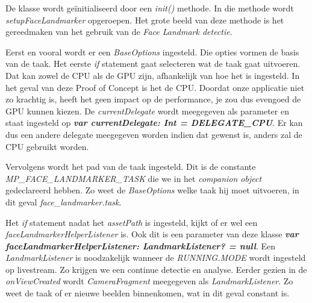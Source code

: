 De klasse wordt geïnitialiseerd door een \emph{init()} methode. In die methode wordt \emph{setupFaceLandmarker} opgeroepen. Het grote beeld van deze methode is het gereedmaken van het gebruik van de \emph{Face Landmark detectie}.

Eerst en vooral wordt er een \emph{BaseOptions} ingesteld. Die opties vormen de basis van de taak. Het eerste \emph{if} statement gaat selecteren wat de taak gaat uitvoeren. Dat kan zowel de CPU als de GPU zijn, afhankelijk van hoe het is ingesteld. In het geval van deze Proof of Concept is het de CPU. Doordat onze applicatie niet zo krachtig is, heeft het geen impact op de performance, je zou dus evengoed de GPU kunnen kiezen. De \emph{currentDelegate} wordt meegegeven als parameter en staat ingesteld op \textbf{\emph{var currentDelegate: Int = DELEGATE\_CPU}}. Er kan dus een andere delegate meegegeven worden indien dat gewenst is, anders zal de CPU gebruikt worden.

Vervolgens wordt het pad van de taak ingesteld. Dit is de constante
\emph{MP\_FACE\_LANDMARKER\_TASK} die we in het \emph{companion object} gedeclareerd hebben. Zo weet de \emph{BaseOptions} welke taak hij moet uitvoeren, in dit geval \emph{face\_landmarker.task}.

Het \emph{if} statement nadat het \emph{assetPath} is ingesteld, kijkt of er wel een \emph{faceLandmarkerHelperListener} is. Ook dit is een parameter van deze klasse \textbf{\emph{var faceLandmarkerHelperListener: LandmarkListener? = null}}. Een \emph{LandmarkListener} is noodzakelijk wanneer de \emph{RUNNING.MODE} wordt ingesteld op livestream. Zo krijgen we een continue detectie en analyse. Eerder gezien in de \emph{onViewCreated} wordt \emph{CameraFragment} meegegeven als \emph{LandmarkListener}. Zo weet de taak of er nieuwe beelden binnenkomen, wat in dit geval constant is.


